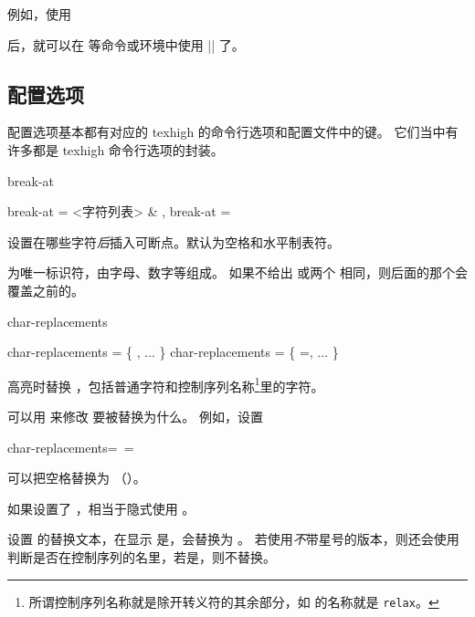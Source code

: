 \documentclass[class=article,openany]{cusdoc}
\begin{document}
例如，使用
\begin{thverbatim}
\end{thverbatim}
后，就可以在  等命令或环境中使用 \texhighverb|| 了。

\subsection{配置选项}

配置选项基本都有对应的 texhigh 的命令行选项和配置文件中的键。
它们当中有许多都是 texhigh 命令行选项的封装。

\begin{keyval}[path=high]{break-at}
  \begin{syntax}
    break-at = <{字符列表}> & \V{\\\ }, 
    break-at =  
  \end{syntax}
设置在哪些字符\emph{后}插入可断点。默认为空格和水平制表符。

 为唯一标识符，由字母、数字等组成。
如果不给出  或两个  相同，则后面的那个会覆盖之前的。
\end{keyval}

\begin{keyval}[path=high]{char-replacements}
  \begin{syntax}
    char-replacements = \V\{ , ... \V\}
    char-replacements = \V\{ =, ... \V\}
  \end{syntax}
高亮时替换 ，包括普通字符和控制序列名称\footnote{所谓控制序列名称就是除开转义符的其余部分，如  的名称就是 \texttt{relax}。}里的字符。

可以用  来修改  要被替换为什么。
例如，设置
\begin{thverbatim}
  char-replacements={\ =\textvisiblespace}
\end{thverbatim}
可以把空格替换为 \texttt{\textvisiblespace}（）。

如果设置了 ，相当于隐式使用 。
\end{keyval}

\begin{function}{\THSetCharReplacement}
  \begin{syntax}
    \V\THSetCharReplacement   {} 
    \V\THSetCharReplacement *  
  \end{syntax}
设置  的替换文本，在显示  是，会替换为 。
若使用\emph{不}带星号的版本，则还会使用  判断是否在控制序列的名里，若是，则不替换。
\end{function}
\end{document}
